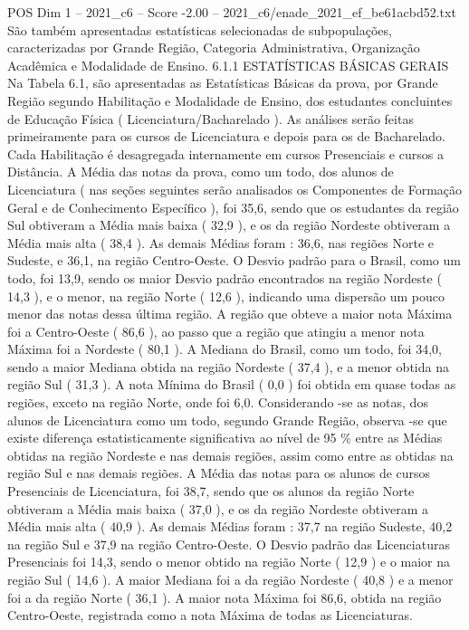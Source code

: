 \begin{textsample}{POS Dim 1 – 2021\_c6 – Score -2.00 – 2021\_c6/enade\_2021\_ef\_be61acbd52.txt}
São também apresentadas estatísticas selecionadas de subpopulações, caracterizadas por Grande Região, Categoria Administrativa, Organização Acadêmica e Modalidade de Ensino. 6.1.1 ESTATÍSTICAS BÁSICAS GERAIS Na Tabela 6.1, são apresentadas as Estatísticas Básicas da prova, por Grande Região segundo Habilitação e Modalidade de Ensino, dos estudantes concluintes de Educação Física ( Licenciatura/Bacharelado ).
As análises serão feitas primeiramente para os cursos de Licenciatura e depois para os de Bacharelado.
Cada Habilitação é desagregada internamente em cursos Presenciais e cursos a Distância.
A Média das notas da prova, como um todo, dos alunos de Licenciatura ( nas seções seguintes serão analisados os Componentes de Formação Geral e de Conhecimento Específico ), foi 35,6, sendo que os estudantes da região Sul obtiveram a Média mais baixa ( 32,9 ), e os da região Nordeste obtiveram a Média mais alta ( 38,4 ).
As demais Médias foram : 36,6, nas regiões Norte e Sudeste, e 36,1, na região Centro-Oeste.
O Desvio padrão para o Brasil, como um todo, foi 13,9, sendo os maior Desvio padrão encontrados na região Nordeste ( 14,3 ), e o menor, na região Norte ( 12,6 ), indicando uma dispersão um pouco menor das notas dessa última região.
A região que obteve a maior nota Máxima foi a Centro-Oeste ( 86,6 ), ao passo que a região que atingiu a menor nota Máxima foi a Nordeste ( 80,1 ).
A Mediana do Brasil, como um todo, foi 34,0, sendo a maior Mediana obtida na região Nordeste ( 37,4 ), e a menor obtida na região Sul ( 31,3 ).
A nota Mínima do Brasil ( 0,0 ) foi obtida em quase todas as regiões, exceto na região Norte, onde foi 6,0.
Considerando -se as notas, dos alunos de Licenciatura como um todo, segundo Grande Região, observa -se que existe diferença estatisticamente significativa ao nível de 95 \% entre as Médias obtidas na região Nordeste e nas demais regiões, assim como entre as obtidas na região Sul e nas demais regiões.
A Média das notas para os alunos de cursos Presenciais de Licenciatura, foi 38,7, sendo que os alunos da região Norte obtiveram a Média mais baixa ( 37,0 ), e os da região Nordeste obtiveram a Média mais alta ( 40,9 ).
As demais Médias foram : 37,7 na região Sudeste, 40,2 na região Sul e 37,9 na região Centro-Oeste.
O Desvio padrão das Licenciaturas Presenciais foi 14,3, sendo o menor obtido na região Norte ( 12,9 ) e o maior na região Sul ( 14,6 ).
A maior Mediana foi a da região Nordeste ( 40,8 ) e a menor foi a da região Norte ( 36,1 ).
A maior nota Máxima foi 86,6, obtida na região Centro-Oeste, registrada como a nota Máxima de todas as Licenciaturas.

\end{textsample}
